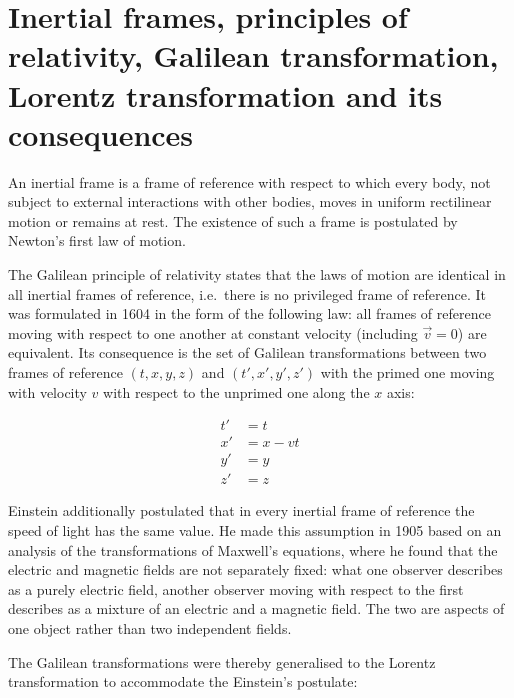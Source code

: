 \cleardoublepage
{}
\section{Inertial frames, principles of relativity, Galilean transformation, Lorentz transformation and its consequences}
\label{sec:inertial-frames}

    An inertial frame is a frame of reference with respect to which every body, not subject to external interactions with other bodies, moves in uniform rectilinear motion or remains at rest. The existence of such a frame is postulated by Newton's first law of motion.

    The Galilean principle of relativity states that the laws of motion are identical in all inertial frames of reference, i.e.\ there is no privileged frame of reference. It was formulated in 1604 in the form of the following law: all frames of reference moving with respect to one another at constant velocity (including $\vec{v}=0$) are equivalent. Its consequence is the set of Galilean transformations between two frames of reference $(t,x,y,z)$ and $(t',x',y',z')$ with the primed one moving with velocity $v$ with respect to the unprimed one along the $x$ axis:

    \begin{equation}\label{eq:gallilean}
        \begin{aligned}
            t' &= t \\
            x' &= x - vt \\
            y' &= y \\
            z' &= z
        \end{aligned}
    \end{equation}

    Einstein additionally postulated that in every inertial frame of reference the speed of light has the same value. He made this assumption in 1905 based on an analysis of the transformations of Maxwell's equations, where he found that the electric and magnetic fields are not separately fixed: what one observer describes as a purely electric field, another observer moving with respect to the first describes as a mixture of an electric and a magnetic field. The two are aspects of one object rather than two independent fields.

    The Galilean transformations were thereby generalised to the Lorentz transformation to accommodate the Einstein's postulate:


